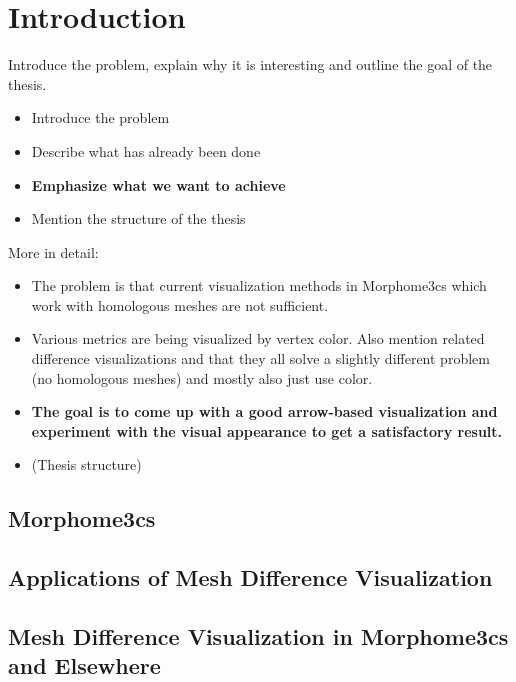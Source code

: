 \chapter*{Introduction}

Introduce the problem, explain why it is interesting and outline the goal of the thesis.

\begin{itemize}
\item Introduce the problem
\item Describe what has already been done
\item {\bf Emphasize what we want to achieve}
\item Mention the structure of the thesis
\end{itemize}

More in detail:

\begin{itemize}
\item The problem is that current visualization methods in Morphome3cs which work with homologous meshes are not sufficient.
\item Various metrics are being visualized by vertex color. Also mention related difference visualizations and that they all solve a slightly different problem (no homologous meshes) and mostly also just use color.
\item {\bf The goal is to come up with a good arrow-based visualization and experiment with the visual appearance to get a satisfactory result.}
\item (Thesis structure)
\end{itemize}

\section*{Morphome3cs}

\section*{Applications of Mesh Difference Visualization}
\section*{Mesh Difference Visualization in Morphome3cs and Elsewhere}

